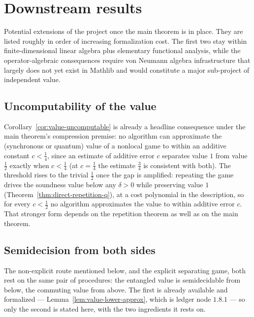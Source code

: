 \section{Downstream results}
\label{ch:downstream}

Potential extensions of the project once the main theorem is in place. They are listed
roughly in order of increasing formalization cost. The first two stay within
finite-dimensional linear algebra plus elementary functional analysis, while the
operator-algebraic consequences require von Neumann algebra infrastructure that
largely does not yet exist in Mathlib and would constitute a major sub-project of
independent value.

\subsection{Uncomputability of the value}

Corollary~\ref{cor:value-uncomputable} is already a headline consequence under the main
theorem's compression premise: no algorithm can approximate the (synchronous or quantum) value of a
nonlocal game to within an additive constant $c < \frac14$, since an estimate of additive
error $c$ separates value $1$ from value $\frac12$ exactly when $c < \frac14$ (at
$c = \frac14$ the estimate $\frac34$ is consistent with both). The threshold rises to the
trivial $\frac12$ once the gap is amplified: repeating the game drives the soundness value
below any $\delta > 0$ while preserving value $1$
(Theorem~\ref{thm:direct-repetition-q}), at a cost polynomial in the description, so for
every $c < \frac12$ no algorithm approximates the value to within additive error $c$. That
stronger form depends on the repetition theorem as well as on the main theorem.

\subsection{Semidecision from both sides}
\label{sec:ds-semidecision}

The non-explicit route mentioned below, and the explicit separating game, both rest on the
same pair of procedures: the entangled value is semidecidable from below, the commuting value
from above. The first is already available and formalized ---
Lemma~\ref{lem:value-lower-approx}, which is ledger node $1.8.1$ --- so only the second is
stated here, with the two ingredients it rests on.

\effortHard

